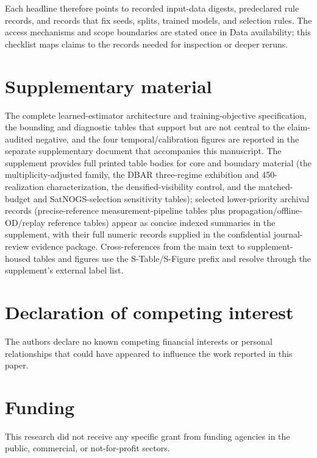 \documentclass{article}
\begin{document}
Each headline therefore points to recorded input-data digests, predeclared rule records, and records that fix seeds, splits, trained models, and selection rules. The access mechanisms and scope boundaries are stated once in Data availability; this checklist maps claims to the records needed for inspection or deeper reruns.

\section*{Supplementary material}
\label{sec:supplementary-material-pointer}
The complete learned-estimator architecture and training-objective specification, the bounding and diagnostic tables that support but are not central to the claim-audited negative, and the four temporal/calibration figures are reported in the separate supplementary document that accompanies this manuscript. The supplement provides full printed table bodies for core and boundary material (the multiplicity-adjusted family, the DBAR three-regime exhibition and 450-realization characterization, the densified-visibility control, and the matched-budget and SatNOGS-selection sensitivity tables); selected lower-priority archival records (precise-reference measurement-pipeline tables plus propagation/offline-OD/replay reference tables) appear as concise indexed summaries in the supplement, with their full numeric records supplied in the confidential journal-review evidence package. Cross-references from the main text to supplement-housed tables and figures use the S-Table/S-Figure prefix and resolve through the supplement's external label list.

\section*{Declaration of competing interest}
The authors declare no known competing financial interests or personal relationships that could have appeared to influence the work reported in this paper.

\section*{Funding}
This research did not receive any specific grant from funding agencies in the public, commercial, or not-for-profit sectors.
\end{document}
